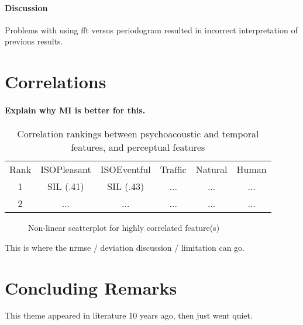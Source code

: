 \paragraph{Discussion} Problems with using fft versus periodogram resulted in incorrect interpretation of previous results.


\section{Correlations}

\paragraph{Explain why MI is better for this.}

\begin{table}[h]
  \centering
  \begin{tabular}{c|c|c|c|c|c}
    Rank & ISOPleasant & ISOEventful & Traffic & Natural & Human \\
    1    & SIL (.41)   & SIL (.43)   & ...     & ...     & ...   \\
    2    & ...         & ...         & ...     & ...     & ...   \\
  \end{tabular}
  \caption{Correlation rankings between psychoacoustic and temporal features, and perceptual features}
  \label{tab:my_label}
\end{table}

\begin{figure}
  \centering
  \caption{Non-linear scatterplot for highly correlated feature(s)}
  \label{fig:scatterplot}
\end{figure}

This is where the nrmse / deviation discussion / limitation can go.

\section{Concluding Remarks}

This theme appeared in literature 10 years ago, then just went quiet.

